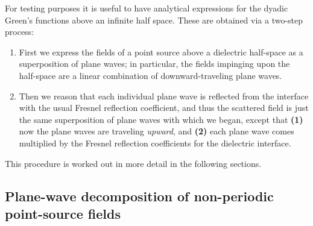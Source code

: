 \documentclass[letterpaper]{article}
\begin{document}
For testing purposes it is useful to have analytical expressions
for the dyadic Green's functions above an infinite half space.
These are obtained via a two-step process:

\begin{enumerate}
 \item First we express the fields of a point source above a 
       dielectric half-space as a superposition of plane waves;
       in particular, the fields impinging upon the half-space
       are a linear combination of downward-traveling plane waves.
 \item Then we reason that each individual plane wave is
       reflected from the interface with the usual Fresnel 
       reflection coefficient, and thus the scattered field
       is just the same superposition of plane waves with which
       we began, except that \textbf{(1)} now the plane waves
       are traveling \textit{upward}, and \textbf{(2)} each plane
       wave comes multiplied by the Fresnel reflection coefficients    
       for the dielectric interface.
\end{enumerate}

This procedure is worked out in more detail in the following
sections.

\subsection{Plane-wave decomposition of non-periodic point-source fields}
\end{document}
